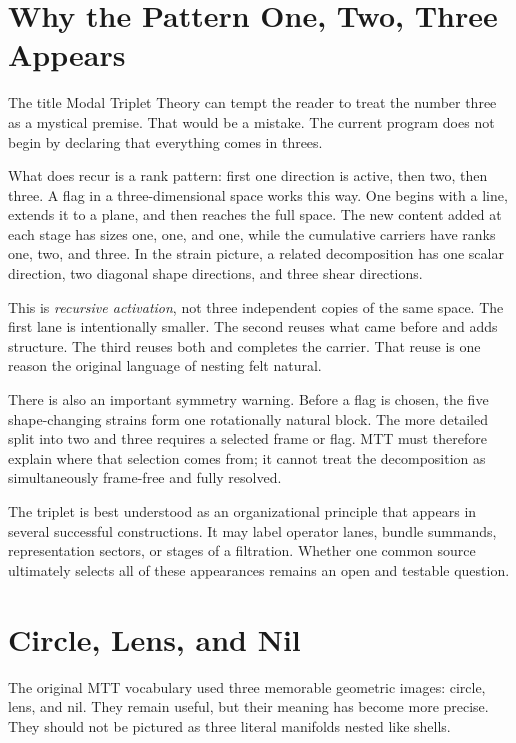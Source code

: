 \documentclass[11pt,openany]{book}
\begin{document}
\chapter{Why the Pattern One, Two, Three Appears}

The title Modal Triplet Theory can tempt the reader to treat the number three
as a mystical premise. That would be a mistake. The current program does not
begin by declaring that everything comes in threes.

What does recur is a rank pattern: first one direction is active, then two,
then three. A flag in a three-dimensional space works this way. One begins
with a line, extends it to a plane, and then reaches the full space. The new
content added at each stage has sizes one, one, and one, while the cumulative
carriers have ranks one, two, and three. In the strain picture, a related
decomposition has one scalar direction, two diagonal shape directions, and
three shear directions.

This is \emph{recursive activation}, not three independent copies of the same
space. The first lane is intentionally smaller. The second reuses what came
before and adds structure. The third reuses both and completes the carrier.
That reuse is one reason the original language of nesting felt natural.

There is also an important symmetry warning. Before a flag is chosen, the
five shape-changing strains form one rotationally natural block. The more
detailed split into two and three requires a selected frame or flag. MTT must
therefore explain where that selection comes from; it cannot treat the
decomposition as simultaneously frame-free and fully resolved.

The triplet is best understood as an organizational principle that appears in
several successful constructions. It may label operator lanes, bundle
summands, representation sectors, or stages of a filtration. Whether one
common source ultimately selects all of these appearances remains an open and
testable question.

\chapter{Circle, Lens, and Nil}

The original MTT vocabulary used three memorable geometric images: circle,
lens, and nil. They remain useful, but their meaning has become more precise.
They should not be pictured as three literal manifolds nested like shells.
\end{document}
